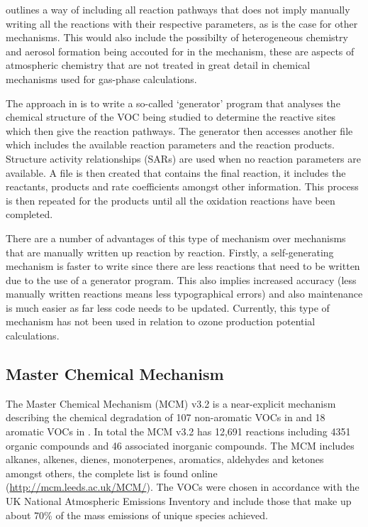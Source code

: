 \citep{Aumont:2005} outlines a way of including all reaction pathways that does not imply manually writing all the reactions 
with their respective parameters, as is the case for other mechanisms. This would also include the possibilty of heterogeneous 
chemistry and aerosol formation being accouted for in the mechanism, these are aspects of atmospheric chemistry that are not 
treated in great detail in chemical mechanisms used for gas-phase calculations.

The approach in \citep{Aumont:2005} is to write a so-called `generator' program that analyses the chemical structure of the VOC 
being studied to determine the reactive sites which then give the reaction pathways. The generator then accesses another file 
which includes the available reaction parameters and the reaction products. Structure activity relationships (SARs) are used 
when no reaction parameters are available. A file is then created that contains the final reaction, it includes the reactants, 
products and rate coefficients amongst other information. This process is then repeated for the products until all the 
oxidation reactions have been completed.

There are a number of advantages of this type of mechanism over mechanisms that are manually written up reaction by reaction. 
Firstly, a self-generating mechanism is faster to write since there are less reactions that need to be written due to the use 
of a generator program. This also implies increased accuracy (less manually written reactions means less typographical errors) 
and also maintenance is much easier as far less code needs to be updated. Currently, this type of mechanism has not been used 
in relation to ozone production potential calculations. 

\subsection{Master Chemical Mechanism}
The Master Chemical Mechanism (MCM) v3.2 is a near-explicit mechanism describing the chemical degradation of 107 non-aromatic 
VOCs in \citep{Saunders:2003} and 18 aromatic VOCs in \citep{Jenkin:2003}. In total the MCM v3.2 has 12,691 reactions including 
4351 organic compounds and 46 associated inorganic compounds. The MCM includes alkanes, alkenes, dienes, monoterpenes, 
aromatics, aldehydes and ketones amongst others, the complete list is found online (\url{http://mcm.leeds.ac.uk/MCM/}). The VOCs
were chosen in accordance with the UK National Atmospheric Emissions Inventory and include those that make up about 70\% of the 
mass emissions of unique species achieved.

